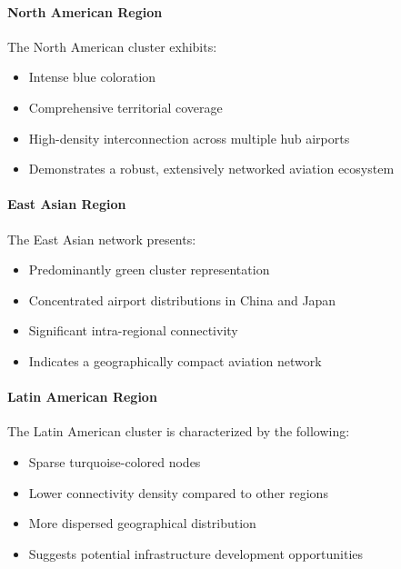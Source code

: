 \documentclass[12pt]{article}
\begin{document}
        \paragraph{North American Region}
        
            The North American cluster exhibits:
            \begin{itemize}
            \item Intense blue coloration
            \item Comprehensive territorial coverage
            \item High-density interconnection across multiple hub airports
            \item Demonstrates a robust, extensively networked aviation ecosystem
            \end{itemize}
        \paragraph{East Asian Region}
        
            The East Asian network presents:
            \begin{itemize}
            \item Predominantly green cluster representation
            \item Concentrated airport distributions in China and Japan
            \item Significant intra-regional connectivity
            \item Indicates a geographically compact aviation network
            \end{itemize}
        \paragraph{Latin American Region}
        
            The Latin American cluster is characterized by the following:
            \begin{itemize}
            \item Sparse turquoise-colored nodes
            \item Lower connectivity density compared to other regions
            \item More dispersed geographical distribution
            \item Suggests potential infrastructure development opportunities
            \end{itemize}
\end{document}
